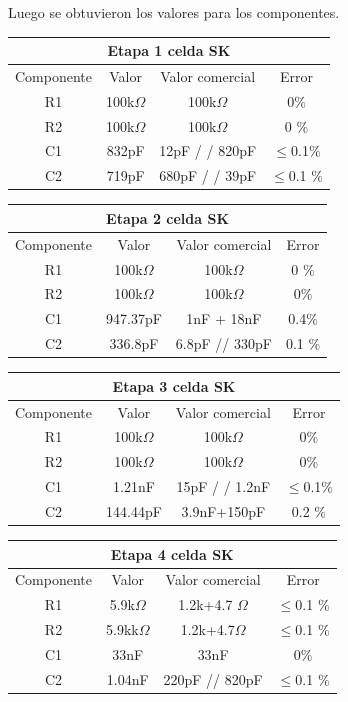 Luego se obtuvieron los valores para los componentes.
\begin{table}[H]
\centering
\begin{tabular}{cccc}
\hline
\multicolumn{4}{|c|}{\textbf{Etapa 1 celda SK}} \\ \hline
Componente & Valor & Valor comercial & Error \\ \hline
R1 & 100k$\Omega$ & 100k$\Omega$ & 0$\%$ \\
R2 & 100k$\Omega$ & 100k$\Omega$ & 0 $\%$\\
C1 & 832pF & 12pF / / 820pF & $\le$0.1$\%$ \\
C2 & 719pF & 680pF / / 39pF & $\le$0.1 $\%$
\end{tabular}
\end{table}
\begin{table}[H]
\centering
\begin{tabular}{cccc}
\hline
\multicolumn{4}{|c|}{\textbf{Etapa 2 celda SK}} \\ \hline
Componente & Valor & Valor comercial & Error \\ \hline
R1 & 100k$\Omega$ & 100k$\Omega$ & 0 $\%$\\
R2 & 100k$\Omega$ & 100k$\Omega$ & 0$\%$ \\
C1 & 947.37pF & 1nF + 18nF & 0.4$\%$ \\
C2 & 336.8pF & 6.8pF // 330pF & 0.1 $\%$
\end{tabular}
\end{table}

\begin{table}[H]
\centering
\begin{tabular}{cccc}
\hline
\multicolumn{4}{|c|}{\textbf{Etapa 3 celda SK}} \\ \hline
Componente & Valor & Valor comercial & Error \\ \hline
R1 & 100k$\Omega$ & 100k$\Omega$ & 0$\%$ \\
R2 & 100k$\Omega$ & 100k$\Omega$ & 0$\%$ \\
C1 & 1.21nF & 15pF / / 1.2nF & $\le$0.1$\%$ \\
C2 & 144.44pF & 3.9nF+150pF & 0.2 $\%$
\end{tabular}
\end{table}

\begin{table}[H]
\centering
\begin{tabular}{cccc}
\hline
\multicolumn{4}{|c|}{\textbf{Etapa 4 celda SK}} \\ \hline
Componente & Valor & Valor comercial & Error \\ \hline
R1 & 5.9k$\Omega$ & 1.2k+4.7 $\Omega$ & $\le$0.1 $\%$ \\
R2 & 5.9kk$\Omega$ &  1.2k+4.7$\Omega$ & $\le$0.1 $\%$ \\
C1 & 33nF & 33nF & 0$\%$ \\
C2 & 1.04nF & 220pF // 820pF & $\le$0.1 $\%$
\end{tabular}
\end{table}

